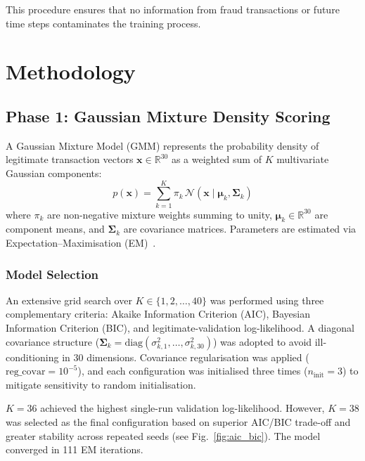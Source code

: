 \documentclass[conference,10pt]{IEEEtran}
\begin{document}
This procedure ensures that no information from fraud transactions or future
time steps contaminates the training process.

\section{Methodology}
\label{sec:method}

\subsection{Phase 1: Gaussian Mixture Density Scoring}
\label{subsec:gmm}

A Gaussian Mixture Model (GMM) represents the probability density of
legitimate transaction vectors $\mathbf{x} \in \mathbb{R}^{30}$ as a weighted
sum of $K$ multivariate Gaussian components:
\begin{equation}
p(\mathbf{x}) = \sum_{k=1}^{K} \pi_k \,
    \mathcal{N}\!\left(\mathbf{x} \mid \boldsymbol{\mu}_k,
    \boldsymbol{\Sigma}_k\right)
\label{eq:gmm}
\end{equation}
where $\pi_k$ are non-negative mixture weights summing to unity,
$\boldsymbol{\mu}_k \in \mathbb{R}^{30}$ are component means, and
$\boldsymbol{\Sigma}_k$ are covariance matrices.  Parameters are estimated
via Expectation--Maximisation (EM)~\cite{dempster1977}.

\subsubsection{Model Selection}
An extensive grid search over $K \in \{1, 2, \ldots, 40\}$ was performed using
three complementary criteria: Akaike Information Criterion (AIC), Bayesian
Information Criterion (BIC), and legitimate-validation log-likelihood.  A
diagonal covariance structure ($\boldsymbol{\Sigma}_k = \mathrm{diag}
(\sigma_{k,1}^2, \ldots, \sigma_{k,30}^2)$) was adopted to avoid
ill-conditioning in 30 dimensions.  Covariance regularisation was applied
($\text{reg\_covar} = 10^{-5}$), and each configuration was initialised three
times ($n_{\text{init}} = 3$) to mitigate sensitivity to random initialisation.

$K = 36$ achieved the highest single-run validation log-likelihood.  However,
$K = 38$ was selected as the final configuration based on superior AIC/BIC
trade-off and greater stability across repeated seeds (see
Fig.~\ref{fig:aic_bic}).  The model converged in 111 EM iterations.
\end{document}
